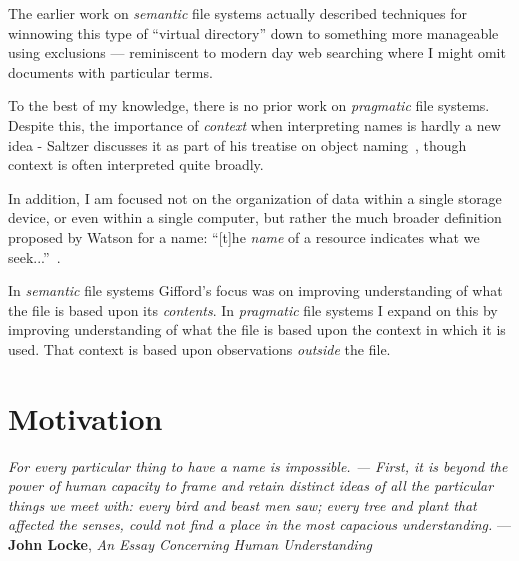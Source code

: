 The earlier work on \emph{semantic} file systems actually described techniques
for winnowing this type of ``virtual directory'' down to something more
manageable using exclusions --- reminiscent to modern day web searching where I
might omit documents with particular terms.

To the best of my knowledge, there is no prior work on \emph{pragmatic} file
systems.  Despite this, the importance of \emph{context} when interpreting names
is hardly a new idea - Saltzer discusses it as part of his treatise on object
naming~\cite{Saltzer1978}, though context is often interpreted quite broadly.

In addition, I am focused not on the organization of data within a single
storage device, or even within a single computer, but rather the much broader
definition proposed by Watson for a name: ``[t]he \emph{name} of a resource
indicates what we seek...''~\cite{watson1981identifiers}.

In \emph{semantic} file systems Gifford's focus was on improving understanding
of what the file is based upon its \emph{contents}.  In \emph{pragmatic} file
systems I expand on this by improving understanding of what the file is based
upon the context in which it is used. That context is based upon observations
\emph{outside} the file.

\section{Motivation}
\label{ch:introduction:sec:motivation}

\begin{epigraph}
    \textit{For every particular thing to have a name is impossible. --- First,
        it is beyond the power of human capacity to frame and retain distinct
        ideas of all the particular things we meet with: every bird and beast men
        saw; every tree and plant that affected the senses, could not find a place
        in the most capacious understanding.} --- \textbf{John Locke}, \textit{An Essay
        Concerning Human Understanding}~\cite{locke1844locke}
\end{epigraph}


